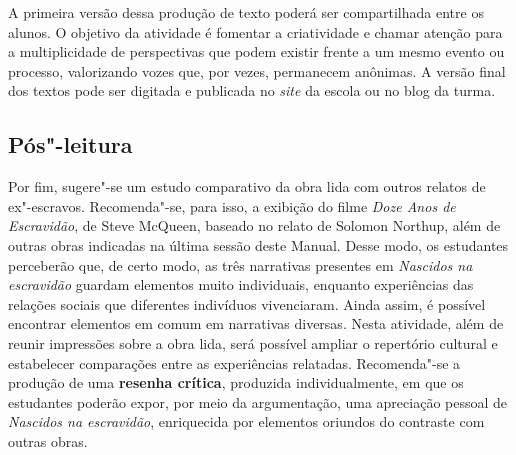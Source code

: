 \documentclass[11pt]{extarticle}
\begin{document}
A primeira versão dessa produção de texto poderá ser compartilhada entre
os alunos. O objetivo da atividade é fomentar a criatividade e chamar
atenção para a multiplicidade de perspectivas que podem existir frente a
um mesmo evento ou processo, valorizando vozes que, por vezes,
permanecem anônimas. A versão final dos textos pode ser digitada e
publicada no \emph{site} da escola ou no blog da turma.

\subsection{Pós"-leitura}


Por fim, sugere"-se um estudo comparativo da obra lida com
outros relatos de ex"-escravos. Recomenda"-se, para isso, a exibição do
filme \emph{Doze Anos de Escravidão}, de Steve McQueen, baseado no
relato de Solomon Northup, além de outras obras indicadas na última
sessão deste Manual. Desse modo, os estudantes perceberão que, de certo
modo, as três narrativas presentes em \emph{Nascidos na escravidão}
guardam elementos muito individuais, enquanto experiências das relações
sociais que diferentes indivíduos vivenciaram. Ainda assim, é possível
encontrar elementos em comum em narrativas diversas. Nesta atividade,
além de reunir impressões sobre a obra lida, será possível ampliar o
repertório cultural e estabelecer comparações entre as experiências
relatadas. Recomenda"-se a produção de uma \textbf{resenha crítica},
produzida individualmente, em que os estudantes poderão expor, por meio
da argumentação, uma apreciação pessoal de \emph{Nascidos na
escravidão}, enriquecida por elementos oriundos do contraste com outras
obras.

\end{document}
